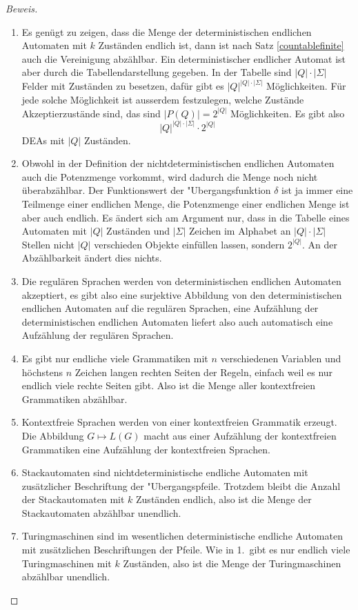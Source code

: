 \begin{proof}[Beweis]
\begin{enumerate}
\item Es genügt zu zeigen, dass die Menge der deterministischen
endlichen Automaten mit $k$ Zuständen endlich ist, dann ist nach
Satz \ref{countablefinite} auch die Vereinigung abzählbar. Ein
deterministischer endlicher Automat ist aber durch die Tabellendarstellung
gegeben. In der Tabelle sind $|Q|\cdot|\Sigma|$ Felder mit Zuständen
zu besetzen, dafür gibt es $|Q|^{|Q|\cdot|\Sigma|}$ Möglichkeiten.
Für jede solche Möglichkeit ist ausserdem festzulegen, welche Zustände
Akzeptierzustände sind, das sind $|P(Q)|=2^{|Q|}$ Möglichkeiten. Es gibt
also
\[
|Q|^{|Q|\cdot|\Sigma|}\cdot 2^{|Q|}
\]
DEAs mit $|Q|$ Zuständen.
\item Obwohl in der Definition der nichtdeterministischen endlichen
Automaten auch die Potenzmenge vorkommt, wird dadurch die Menge
noch nicht über\-abzählbar. Der Funktionswert der "Ubergangsfunktion
$\delta$ ist ja immer eine Teilmenge einer endlichen Menge, die Potenzmenge
einer endlichen Menge ist aber auch endlich. Es ändert sich am Argument
nur, dass in die Tabelle eines Automaten mit $|Q|$ Zuständen und
$|\Sigma|$ Zeichen im Alphabet an $|Q|\cdot|\Sigma|$ Stellen
nicht $|Q|$ verschieden Objekte einfüllen lassen, sondern $2^{|Q|}$.
An der Abzählbarkeit ändert dies nichts.
\item Die regulären Sprachen werden von deterministischen endlichen
Automaten akzeptiert, es gibt also eine surjektive Abbildung von
den deterministischen endlichen Automaten auf die regulären Sprachen,
eine Aufzählung der deterministischen endlichen Automaten liefert also
auch automatisch eine Aufzählung der regulären Sprachen.
\item Es gibt nur endliche viele Grammatiken mit $n$ verschiedenen
Variablen und höchstens $n$ Zeichen langen rechten Seiten der Regeln,
einfach weil es nur endlich viele rechte Seiten gibt. Also ist die
Menge aller kontextfreien Grammatiken abzählbar.
\item Kontextfreie Sprachen werden von einer kontextfreien Grammatik
erzeugt. Die Abbildung $G\mapsto L(G)$ macht aus einer Aufzählung
der kontextfreien Grammatiken eine Aufzählung der kontextfreien Sprachen.
\item Stackautomaten sind nichtdeterministische endliche Automaten mit
zusätzlicher Beschriftung der "Ubergangspfeile. Trotzdem bleibt die
Anzahl der Stackautomaten mit $k$ Zuständen endlich, also ist die
Menge der Stackautomaten abzählbar unendlich.
\item Turingmaschinen sind im wesentlichen deterministische endliche Automaten
mit zusätzlichen Beschriftungen der Pfeile. Wie in 1.~gibt es nur endlich
viele Turingmaschinen mit $k$ Zuständen, also ist die Menge der Turingmaschinen
abzählbar unendlich.
\end{enumerate}
\end{proof}

